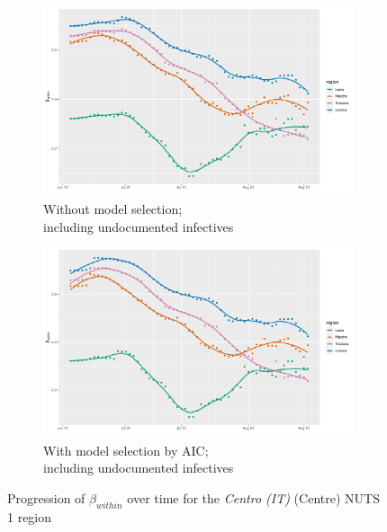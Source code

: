 \documentclass[12pt]{article}
\begin{document}
\begin{appendices}
\begin{figure}[H]
\begin{subfigure}{\textwidth}
    	      \includegraphics[width=0.95\linewidth]{output/model_within_lag14_betawithin_Centro (IT)_UndocQuadratic_rolling.pdf}
    	      \caption{Without model selection; \\ including undocumented infectives}
    	      \label{fig:beta_within_over_time_centro_regular_undoc}
    	    \end{subfigure}\newline
    	    \begin{subfigure}{\textwidth}
    	      \centering
    	      \includegraphics[width=0.95\linewidth]{output/model_within_lag14_betawithin_Centro (IT)_aic_UndocQuadratic_rolling.pdf}
    	      \caption{With model selection by AIC; \\ including undocumented infectives}
    	      \label{fig:beta_within_over_time_centro_aic_undoc}
    	    \end{subfigure}
    	    \caption{Progression of $\beta_{within}$ over time for the \textit{Centro (IT)} (Centre) NUTS 1 region}
    	    \label{fig:beta_within_over_time_centro}
	    \end{figure}
		

\end{appendices}
\end{document}
